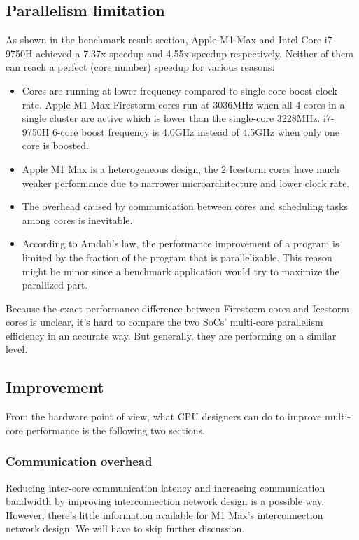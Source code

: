 \documentclass[11pt]{article}
\begin{document}
\subsection{Parallelism limitation}
As shown in the benchmark result section, Apple M1 Max and Intel Core i7-9750H achieved a 7.37x speedup and 4.55x speedup respectively. Neither of them can reach a perfect (core number) speedup for various reasons:
\begin{itemize}
    \item Cores are running at lower frequency compared to single core boost clock rate. Apple M1 Max Firestorm cores run at 3036MHz when all 4 cores in a single cluster are active which is lower than the single-core 3228MHz. i7-9750H 6-core boost frequency is 4.0GHz instead of 4.5GHz when only one core is boosted.
    \item Apple M1 Max is a heterogeneous design, the 2 Icestorm cores have much weaker performance due to narrower microarchitecture and lower clock rate. 
    \item The overhead caused by communication between cores and scheduling tasks among cores is inevitable.
    \item According to Amdah’s law,  the performance improvement of a program is limited by the fraction of the program that is parallelizable. This reason might be minor since a benchmark application would try to maximize the parallized part.
\end{itemize}
Because the exact performance difference between Firestorm cores and Icestorm cores is unclear, it’s hard to compare the two SoCs' multi-core parallelism efficiency in an accurate way. But generally, they are performing on a similar level.
\subsection*{Improvement}
From the hardware point of view, what CPU designers can do to improve multi-core performance is the following two sections.
\subsubsection*{Communication overhead}
Reducing inter-core communication latency and increasing communication bandwidth by improving interconnection network design is a possible way. However, there’s little information available for M1 Max’s interconnection network design. We will have to skip further discussion.
\end{document}
